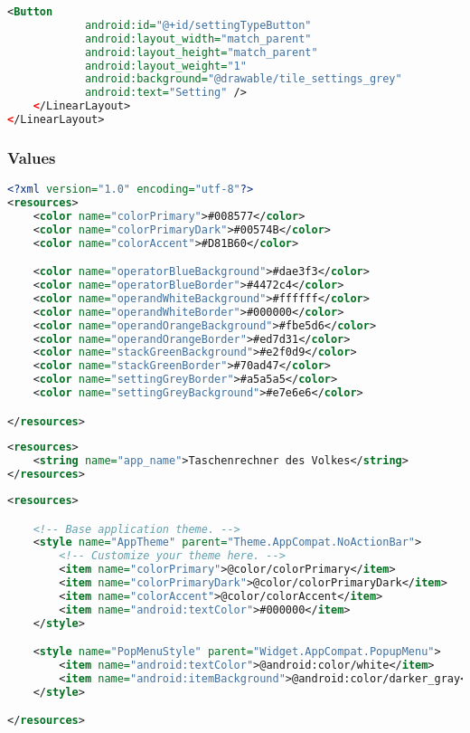 \begin{lstlisting}[caption=input\_tile\_type.xml,label=list:input_tile_type.xml,language=XML]
        <Button
            android:id="@+id/settingTypeButton"
            android:layout_width="match_parent"
            android:layout_height="match_parent"
            android:layout_weight="1"
            android:background="@drawable/tile_settings_grey"
            android:text="Setting" />
    </LinearLayout>
</LinearLayout>
\end{lstlisting}    
   
\subsubsection{Values}

\begin{lstlisting}[caption=colors.xml,label=list:colors.xml,language=XML]
<?xml version="1.0" encoding="utf-8"?>
<resources>
    <color name="colorPrimary">#008577</color>
    <color name="colorPrimaryDark">#00574B</color>
    <color name="colorAccent">#D81B60</color>

    <color name="operatorBlueBackground">#dae3f3</color>
    <color name="operatorBlueBorder">#4472c4</color>
    <color name="operandWhiteBackground">#ffffff</color>
    <color name="operandWhiteBorder">#000000</color>
    <color name="operandOrangeBackground">#fbe5d6</color>
    <color name="operandOrangeBorder">#ed7d31</color>
    <color name="stackGreenBackground">#e2f0d9</color>
    <color name="stackGreenBorder">#70ad47</color>
    <color name="settingGreyBorder">#a5a5a5</color>
    <color name="settingGreyBackground">#e7e6e6</color>

</resources>
\end{lstlisting}    

\begin{lstlisting}[caption=strings.xml,label=list:strings.xml,language=XML]
<resources>
    <string name="app_name">Taschenrechner des Volkes</string>
</resources>
\end{lstlisting}    

\begin{lstlisting}[caption=styles.xml,label=list:styles.xml,language=XML]
<resources>

    <!-- Base application theme. -->
    <style name="AppTheme" parent="Theme.AppCompat.NoActionBar">
        <!-- Customize your theme here. -->
        <item name="colorPrimary">@color/colorPrimary</item>
        <item name="colorPrimaryDark">@color/colorPrimaryDark</item>
        <item name="colorAccent">@color/colorAccent</item>
        <item name="android:textColor">#000000</item>
    </style>

    <style name="PopMenuStyle" parent="Widget.AppCompat.PopupMenu">
        <item name="android:textColor">@android:color/white</item>
        <item name="android:itemBackground">@android:color/darker_gray</item>
    </style>

</resources>
\end{lstlisting}    

